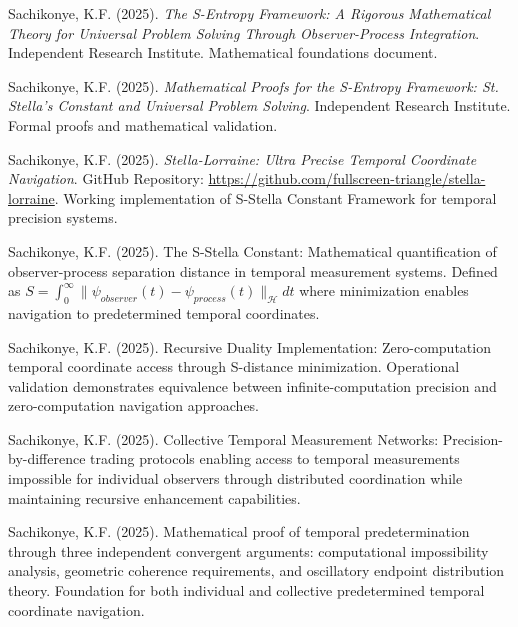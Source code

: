 \documentclass[12pt,a4paper]{article}
\begin{document}

\begin{thebibliography}{99}

Sachikonye, K.F. (2025). \textit{The S-Entropy Framework: A Rigorous Mathematical Theory for Universal Problem Solving Through Observer-Process Integration}. Independent Research Institute. Mathematical foundations document.

Sachikonye, K.F. (2025). \textit{Mathematical Proofs for the S-Entropy Framework: St. Stella's Constant and Universal Problem Solving}. Independent Research Institute. Formal proofs and mathematical validation.

Sachikonye, K.F. (2025). \textit{Stella-Lorraine: Ultra Precise Temporal Coordinate Navigation}. GitHub Repository: \url{https://github.com/fullscreen-triangle/stella-lorraine}. Working implementation of S-Stella Constant Framework for temporal precision systems.

Sachikonye, K.F. (2025). The S-Stella Constant: Mathematical quantification of observer-process separation distance in temporal measurement systems. Defined as $S = \int_0^{\infty} \|\psi_{observer}(t) - \psi_{process}(t)\|_{\mathcal{H}} dt$ where minimization enables navigation to predetermined temporal coordinates.

Sachikonye, K.F. (2025). Recursive Duality Implementation: Zero-computation temporal coordinate access through S-distance minimization. Operational validation demonstrates equivalence between infinite-computation precision and zero-computation navigation approaches.

Sachikonye, K.F. (2025). Collective Temporal Measurement Networks: Precision-by-difference trading protocols enabling access to temporal measurements impossible for individual observers through distributed coordination while maintaining recursive enhancement capabilities.

Sachikonye, K.F. (2025). Mathematical proof of temporal predetermination through three independent convergent arguments: computational impossibility analysis, geometric coherence requirements, and oscillatory endpoint distribution theory. Foundation for both individual and collective predetermined temporal coordinate navigation.


\end{thebibliography}
\end{document}
